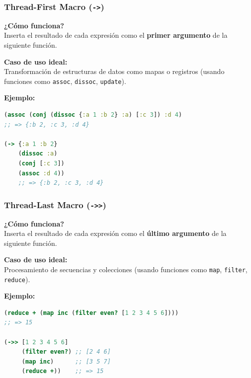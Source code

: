 \documentclass{beamer}
\begin{document}
\begin{frame}[fragile]
    \frametitle{Thread-First Macro (\texttt{->})}
    
    \textbf{¿Cómo funciona?} \\
    Inserta el resultado de cada expresión como el \textbf{primer argumento} de la siguiente función.
    
    \vspace{0.5cm}
    
    \textbf{Caso de uso ideal:} \\
    Transformación de estructuras de datos como mapas o registros (usando funciones como \texttt{assoc}, \texttt{dissoc}, \texttt{update}).
    
    \vspace{0.5cm}
    
    \textbf{Ejemplo:}
\begin{lstlisting}[language=Clojure]
(assoc (conj (dissoc {:a 1 :b 2} :a) [:c 3]) :d 4)
;; => {:b 2, :c 3, :d 4}

(-> {:a 1 :b 2}
    (dissoc :a)   
    (conj [:c 3]) 
    (assoc :d 4))
    ;; => {:b 2, :c 3, :d 4}
\end{lstlisting}
\end{frame}

\begin{frame}[fragile]
    \frametitle{Thread-Last Macro (\texttt{->>})}
    
    \textbf{¿Cómo funciona?} \\
    Inserta el resultado de cada expresión como el \textbf{último argumento} de la siguiente función.
    
    \vspace{0.5cm}
    
    \textbf{Caso de uso ideal:} \\
    Procesamiento de secuencias y colecciones (usando funciones como \texttt{map}, \texttt{filter}, \texttt{reduce}).
    
    \vspace{0.5cm}
    
    \textbf{Ejemplo:}
\begin{lstlisting}[language=Clojure]
(reduce + (map inc (filter even? [1 2 3 4 5 6])))
;; => 15

(->> [1 2 3 4 5 6]
     (filter even?) ;; [2 4 6]
     (map inc)      ;; [3 5 7]
     (reduce +))    ;; => 15
\end{lstlisting}
\end{frame}
\end{document}
